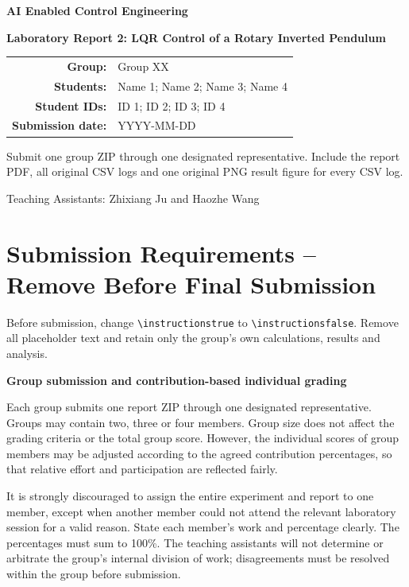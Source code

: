 \documentclass[11pt,a4paper]{article}
\newcommand{\CourseName}{AI Enabled Control Engineering}
\newcommand{\ReportTitle}{Laboratory Report 2: LQR Control of a Rotary Inverted Pendulum}
\newcommand{\GroupNumber}{Group XX}
\newcommand{\StudentNames}{Name 1; Name 2; Name 3; Name 4}
\newcommand{\StudentIDs}{ID 1; ID 2; ID 3; ID 4}
\newcommand{\SubmissionDate}{YYYY-MM-DD}
\newif\ifinstructions
\begin{document}
\begin{titlepage}
\centering
\vspace*{15mm}
{\Large\bfseries \CourseName\par}
\vspace{13mm}
{\huge\bfseries\color{TAblue} \ReportTitle\par}
\vspace{18mm}
\begin{tabular}{>{\bfseries}rl}
Group: & \GroupNumber\\[2mm]
Students: & \StudentNames\\[2mm]
Student IDs: & \StudentIDs\\[2mm]
Submission date: & \SubmissionDate
\end{tabular}
\vfill
\begin{tcolorbox}[width=0.86\linewidth,colback=TAgray,colframe=TAblue]
\centering
Submit one group ZIP through one designated representative. Include the report
PDF, all original CSV logs and one original PNG result figure for every CSV log.
\end{tcolorbox}
\vspace{8mm}
{\small Teaching Assistants: Zhixiang Ju and Haozhe Wang}
\end{titlepage}

\ifinstructions
\section*{Submission Requirements -- Remove Before Final Submission}

\begin{warningbox}
Before submission, change \verb|\instructionstrue| to
\verb|\instructionsfalse|. Remove all placeholder text and retain only the
group's own calculations, results and analysis.
\end{warningbox}

\begin{requirementbox}
\textbf{Group submission and contribution-based individual grading}

Each group submits one report ZIP through one designated representative. Groups
may contain two, three or four members. Group size does not affect the grading
criteria or the total group score. However, the individual scores of group
members may be adjusted according to the agreed contribution percentages, so
that relative effort and participation are reflected fairly.

It is strongly discouraged to assign the entire experiment and report to one
member, except when another member could not attend the relevant laboratory
session for a valid reason. State each member's work and percentage clearly.
The percentages must sum to 100\%. The teaching assistants will not determine
or arbitrate the group's internal division of work; disagreements must be
resolved within the group before submission.
\end{requirementbox}
\end{document}
